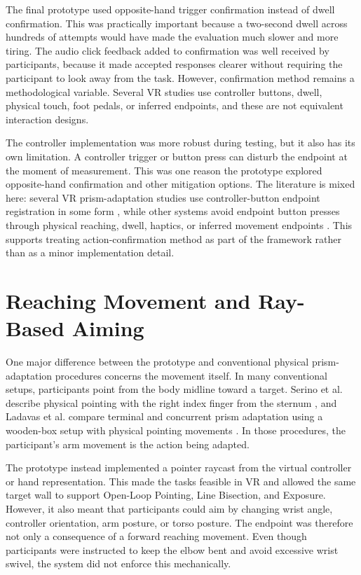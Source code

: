 The final prototype used opposite-hand trigger confirmation instead of dwell confirmation. This was practically important because a two-second dwell across hundreds of attempts would have made the evaluation much slower and more tiring. The audio click feedback added to confirmation was well received by participants, because it made accepted responses clearer without requiring the participant to look away from the task. However, confirmation method remains a methodological variable. Several VR studies use controller buttons, dwell, physical touch, foot pedals, or inferred endpoints, and these are not equivalent interaction designs.

The controller implementation was more robust during testing, but it also has its own limitation. A controller trigger or button press can disturb the endpoint at the moment of measurement. This was one reason the prototype explored opposite-hand confirmation and other mitigation options. The literature is mixed here: several VR prism-adaptation studies use controller-button endpoint registration in some form \cite{Bourgeois2021,Gammeri2020,anan2025comparative}, while other systems avoid endpoint button presses through physical reaching, dwell, haptics, or inferred movement endpoints \cite{cho2022feasibility,gerken2025sense,Ramos2019}. This supports treating action-confirmation method as part of the framework rather than as a minor implementation detail.

\section{Reaching Movement and Ray-Based Aiming}
\label{sec:discussion-reaching-ray}

One major difference between the prototype and conventional physical prism-adaptation procedures concerns the movement itself. In many conventional setups, participants point from the body midline toward a target. Serino et al. describe physical pointing with the right index finger from the sternum \cite{serino2006mechanisms}, and Ladavas et al. compare terminal and concurrent prism adaptation using a wooden-box setup with physical pointing movements \cite{Serino2011}. In those procedures, the participant's arm movement is the action being adapted.

The prototype instead implemented a pointer raycast from the virtual controller or hand representation. This made the tasks feasible in VR and allowed the same target wall to support Open-Loop Pointing, Line Bisection, and Exposure. However, it also meant that participants could aim by changing wrist angle, controller orientation, arm posture, or torso posture. The endpoint was therefore not only a consequence of a forward reaching movement. Even though participants were instructed to keep the elbow bent and avoid excessive wrist swivel, the system did not enforce this mechanically.


